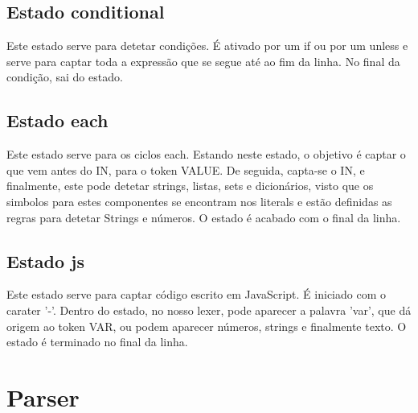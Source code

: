 \documentclass[11pt,a4paper]{report}%
\begin{document}
\subsection{Estado conditional}

Este estado serve para detetar condições. É ativado por um if ou por um unless e serve para captar toda a expressão que se segue até ao fim da linha. No final da condição, sai do estado.

\subsection{Estado each}

Este estado serve para os ciclos each. Estando neste estado, o objetivo é captar o que vem antes do IN, para o token VALUE. De seguida, capta-se o IN, e finalmente, este pode detetar strings, listas, sets e dicionários, visto que os simbolos para estes componentes se encontram nos literals e estão definidas as regras para detetar Strings e números. O estado é acabado com o final da linha.

\subsection{Estado js}

Este estado serve para captar código escrito em JavaScript. É iniciado com o carater '-'. Dentro do estado, no nosso lexer, pode aparecer a palavra 'var', que dá origem ao token VAR, ou podem aparecer números, strings e finalmente texto. O estado é terminado no final da linha.



\section{Parser}
\end{document}
